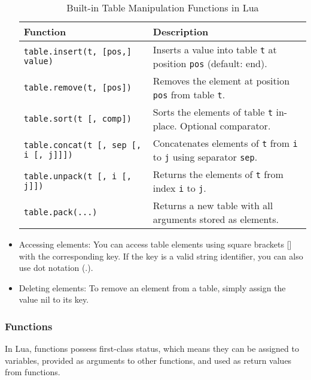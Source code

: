 \begin{itemize}
\begin{table}[htbp]
\centering
\caption{Built-in Table Manipulation Functions in Lua}
\begin{tabular}{@{}ll@{}}
\toprule
\textbf{Function} & \textbf{Description} \\
\midrule
\texttt{table.insert(t, [pos,] value)} & Inserts a value into table \texttt{t} at position \texttt{pos} (default: end). \\
\texttt{table.remove(t, [pos])}        & Removes the element at position \texttt{pos} from table \texttt{t}. \\
\texttt{table.sort(t [, comp])}        & Sorts the elements of table \texttt{t} in-place. Optional comparator. \\
\texttt{table.concat(t [, sep [, i [, j]]])} & Concatenates elements of \texttt{t} from \texttt{i} to \texttt{j} using separator \texttt{sep}. \\
\texttt{table.unpack(t [, i [, j]])}   & Returns the elements of \texttt{t} from index \texttt{i} to \texttt{j}. \\
\texttt{table.pack(...)}          & Returns a new table with all arguments stored as elements. \\

\bottomrule
\end{tabular}
\end{table}






\item Accessing elements: You can access table elements using square brackets [] with the corresponding key. If the key is a valid string identifier, you can also use dot notation (.).
\item Deleting elements: To remove an element from a table, simply assign the value nil to its key.
\end{itemize}

\subsubsection{Functions}

In Lua, functions possess first-class status, which means they can be assigned to variables, provided as arguments to other functions, and used as return values from functions.

